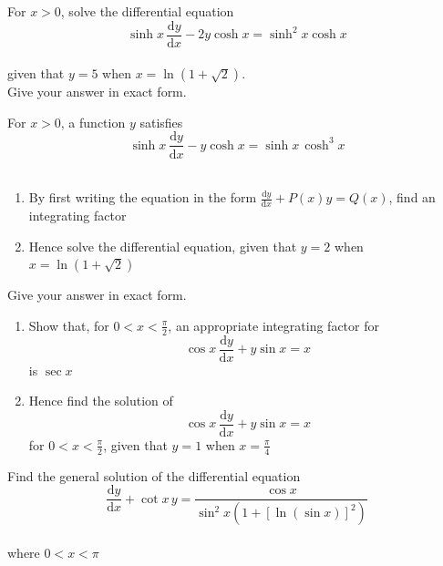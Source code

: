 \documentclass[leqno]{article}
\begin{document}
\begin{enumerate}[
  label=\textbf{\arabic*.},
  leftmargin=*,
  topsep=0pt,
  partopsep=0pt,
  parsep=0pt
]
\newpage

\questionitem

For $x>0$, solve the differential equation\\
\[
\sinh x\,\frac{\mathrm{d}y}{\mathrm{d}x} - 2y\cosh x = \sinh^2 x\cosh x
\] \\
given that $y=5$ when $x=\ln(1+\sqrt{2})$. \\
Give your answer in exact form. 

\newpage

\questionitem

For $x>0$, a function $y$ satisfies \\
\[
\sinh x\,\frac{\mathrm{d}y}{\mathrm{d}x}-y\cosh x=\sinh x\,\cosh^3 x
\] \\
\begin{enumerate}[label=\textbf{(\alph*)}]
  \item By first writing the equation in the form $\frac{\mathrm{d}y}{\mathrm{d}x}+P(x)y=Q(x)$, find an integrating factor  \\
  \item Hence solve the differential equation, given that $y=2$ when $x=\ln(1+\sqrt{2})$  \\
\end{enumerate}
Give your answer in exact form.

\newpage

\questionitem

\begin{enumerate}[label=\textbf{(\alph*)}]
  \item Show that, for $0<x<\frac{\pi}{2}$, an appropriate integrating factor for
  \[
  \cos x\,\frac{\mathrm{d}y}{\mathrm{d}x}+y\sin x=x
  \]
  is $\sec x$  \\
  \item Hence find the solution of
  \[
  \cos x\,\frac{\mathrm{d}y}{\mathrm{d}x}+y\sin x=x
  \]
  for $0<x<\frac{\pi}{2}$, given that $y=1$ when $x=\frac{\pi}{4}$  \\
\end{enumerate}

\newpage

\questionitem

Find the general solution of the differential equation\\
\[
\frac{\mathrm{d}y}{\mathrm{d}x}+\cot x\,y=\frac{\cos x}{\sin^2 x\left(1+\left[\ln(\sin x)\right]^2\right)}
\]\\
where $0<x<\pi$ 


\end{enumerate}
\end{document}

